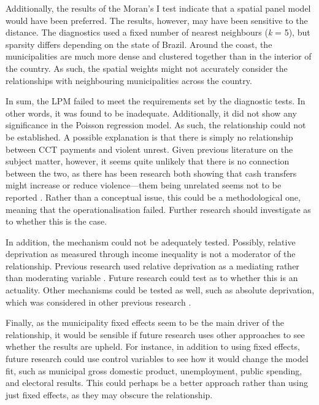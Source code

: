 \documentclass[stu,12pt]{apa7}
\begin{document}
Additionally, the results of the Moran’s I test indicate that a spatial panel model would have been preferred. The results, however, may have been sensitive to the distance. The diagnostics used a fixed number of nearest neighbours (\textit{k} = 5), but sparsity differs depending on the state of Brazil. Around the coast, the municipalities are much more dense and clustered together than in the interior of the country. As such, the spatial weights might not accurately consider the relationships with neighbouring municipalities across the country.

In sum, the LPM failed to meet the requirements set by the diagnostic tests. In other words, it was found to be inadequate. Additionally, it did not show any significance in the Poisson regression model. As such, the relationship could not be established. A possible explanation is that there is simply no relationship between CCT payments and violent unrest. Given previous literature on the subject matter, however, it seems quite unlikely that there is no connection between the two, as there has been research both showing that cash transfers might increase or reduce violence—them being unrelated seems not to be reported \parencite{machadoConditionalCashTransfer2018, zizumbo-colungaUnintendedConsequencesConditional2023}. Rather than a conceptual issue, this could be a methodological one, meaning that the operationalisation failed. Further research should investigate as to whether this is the case.

In addition, the mechanism could not be adequately tested. Possibly, relative deprivation as measured through income inequality is not a moderator of the relationship. Previous research used relative deprivation as a mediating rather than moderating variable \parencite{jiangRelativeDeprivationMechanism2020}. Future research could test as to whether this is an actuality. Other mechanisms could be tested as well, such as absolute deprivation, which was considered in other previous research \parencite{burrastonRelativeAbsoluteDeprivations2018} .

Finally, as the municipality fixed effects seem to be the main driver of the relationship, it would be sensible if future research uses other approaches to see whether the results are upheld. For instance, in addition to using fixed effects, future research could use control variables to see how it would change the model fit, such as municipal gross domestic product, unemployment, public spending, and electoral results. This could perhaps be a better approach rather than using just fixed effects, as they may obscure the relationship.
\end{document}
